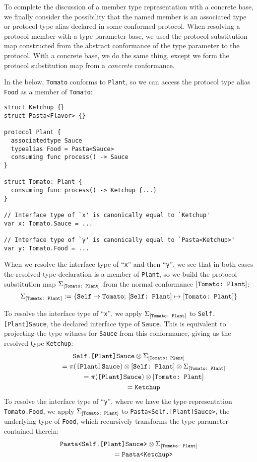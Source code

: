 \documentclass[../generics]{subfiles}
\begin{document}
To complete the discussion of a member type representation with a concrete base, we finally consider the possibility that the named member is an associated type or protocol type alias declared in some conformed protocol. When resolving a protocol member with a type parameter base, we used the protocol substitution map constructed from the abstract conformance of the type parameter to the protocol. With a concrete base, we do the same thing, except we form the protocol substitution map from a \emph{concrete} conformance.

In the below, \texttt{Tomato} conforms to \texttt{Plant}, so we can access the protocol type alias \texttt{Food} as a member of \texttt{Tomato}:
\begin{Verbatim}
struct Ketchup {}
struct Pasta<Flavor> {}

protocol Plant {
  associatedtype Sauce
  typealias Food = Pasta<Sauce>
  consuming func process() -> Sauce
}

struct Tomato: Plant {
  consuming func process() -> Ketchup {...}
}

// Interface type of `x' is canonically equal to `Ketchup'
var x: Tomato.Sauce = ...

// Interface type of `y' is canonically equal to `Pasta<Ketchup>'
var y: Tomato.Food = ...
\end{Verbatim}
When we resolve the interface type of ``\texttt{x}'' and then ``\texttt{y}'', we see that in both cases the resolved type declaration is a member of \texttt{Plant}, so we build the protocol substitution map $\Sigma_{[\texttt{Tomato:~Plant}]}$ from the normal conformance $[\texttt{Tomato:~Plant}]$:
\[\Sigma_{[\texttt{Tomato:~Plant}]} := \{\texttt{Self} \mapsto \texttt{Tomato};\,[\texttt{Self:~Plant}] \mapsto [\texttt{Tomato:~Plant}]\}\]

To resolve the interface type of ``\texttt{x}'', we apply $\Sigma_{[\texttt{Tomato:~Plant}]}$ to \texttt{Self.[Plant]Sauce}, the declared interface type of \texttt{Sauce}. This is equivalent to projecting the type witness for \texttt{Sauce} from this conformance, giving us the resolved type \texttt{Ketchup}:
\begin{gather*}
\texttt{Self.[Plant]Sauce} \otimes \Sigma_{[\texttt{Tomato:~Plant}]}\\
\qquad\qquad {} = \pi(\texttt{[Plant]Sauce}) \otimes [\texttt{Self:~Plant}] \otimes \Sigma_{[\texttt{Tomato:~Plant}]}\\
\qquad\qquad {} = \pi(\texttt{[Plant]Sauce}) \otimes [\texttt{Tomato:~Plant}]\\
\qquad\qquad {} = \texttt{Ketchup}
\end{gather*}
To resolve the interface type of ``\texttt{y}'', where we have the type representation \texttt{Tomato.Food}, we apply $\Sigma_{[\texttt{Tomato:~Plant}]}$ to \texttt{Pasta<Self.[Plant]Sauce>}, the underlying type of \texttt{Food}, which recursively transforms the type parameter contained therein:
\begin{gather*}
\texttt{Pasta<Self.[Plant]Sauce>} \otimes \Sigma_{[\texttt{Tomato:~Plant}]}\\
\qquad\qquad {} = \texttt{Pasta<Ketchup>}
\end{gather*}
\end{document}
